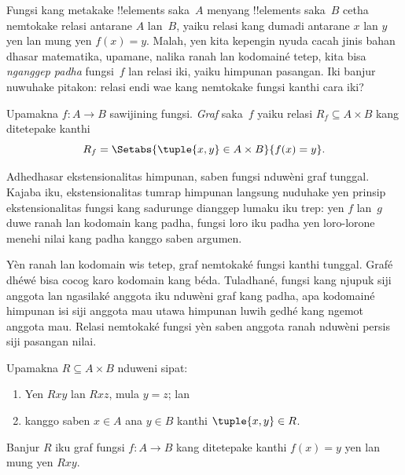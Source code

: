 \documentclass[../../../include/open-logic-section]{subfiles}
\begin{document}


\begin{explain}
Fungsi kang metakake !!{element}s saka~$A$ menyang !!{element}s saka~$B$
cetha nemtokake relasi antarane $A$ lan~$B$, yaiku relasi
kang dumadi antarane $x$ lan $y$ yen lan mung yen $f(x) = y$. Malah,
yen kita kepengin nyuda cacah jinis bahan dhasar matematika, upamane,
nalika ranah lan kodomainé tetep, kita bisa \emph{nganggep padha}
fungsi~$f$ lan relasi iki, yaiku himpunan pasangan. Iki banjur nuwuhake pitakon:
relasi endi wae kang nemtokake fungsi kanthi cara iki?
\end{explain}

\begin{defn} Upamakna $f\colon A \to B$ sawijining fungsi.
\emph{Graf} saka~$f$ yaiku relasi $R_f \subseteq A \times B$
kang ditetepake kanthi
\[
R_f = \Setabs{\tuple{x,y} \in A \times B}{f(x) = y}.
\]
\end{defn}

\begin{explain}
Adhedhasar ekstensionalitas himpunan, saben fungsi nduwèni graf tunggal.
Kajaba iku, ekstensionalitas tumrap himpunan langsung nuduhake yen
prinsip ekstensionalitas fungsi kang sadurunge dianggep lumaku iku trep:
yen $f$ lan~$g$ duwe ranah lan kodomain kang padha,
fungsi loro iku padha yen loro-lorone menehi
nilai kang padha kanggo saben argumen.

Yèn ranah lan kodomain wis tetep, graf nemtokaké fungsi kanthi tunggal. Grafé dhéwé bisa cocog karo kodomain kang béda.
Tuladhané, fungsi kang njupuk siji anggota lan ngasilaké anggota iku
nduwèni graf kang padha, apa kodomainé himpunan isi siji anggota mau
utawa himpunan luwih gedhé kang ngemot anggota mau.
Relasi nemtokaké fungsi yèn saben anggota ranah nduwèni persis siji pasangan nilai.
\end{explain}

\begin{prop}
Upamakna $R \subseteq A \times B$ nduweni sipat:
\begin{enumerate}
\item Yen $Rxy$ lan $Rxz$, mula $y = z$; lan
\item kanggo saben $x \in A$ ana $y \in B$ kanthi $\tuple{x,
y} \in R$.
\end{enumerate}
Banjur $R$ iku graf fungsi $f\colon A \to B$ kang ditetepake kanthi
$f(x) = y$ yen lan mung yen $Rxy$.
\end{prop}
\end{document}
